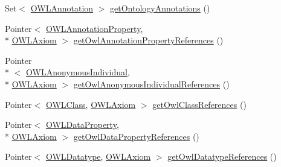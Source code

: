 \begin{DoxyCompactItemize}
\item 
Set$<$ \hyperlink{interfaceorg_1_1semanticweb_1_1owlapi_1_1model_1_1_o_w_l_annotation}{O\-W\-L\-Annotation} $>$ \hyperlink{interfaceuk_1_1ac_1_1manchester_1_1cs_1_1owl_1_1owlapi_1_1_internals_a18433a6e4962db8b311e6369831f7b9a}{get\-Ontology\-Annotations} ()
\item 
Pointer$<$ \hyperlink{interfaceorg_1_1semanticweb_1_1owlapi_1_1model_1_1_o_w_l_annotation_property}{O\-W\-L\-Annotation\-Property}, \\*
\hyperlink{interfaceorg_1_1semanticweb_1_1owlapi_1_1model_1_1_o_w_l_axiom}{O\-W\-L\-Axiom} $>$ \hyperlink{interfaceuk_1_1ac_1_1manchester_1_1cs_1_1owl_1_1owlapi_1_1_internals_a09768fe68798949a916e32e77f49a562}{get\-Owl\-Annotation\-Property\-References} ()
\item 
Pointer\\*
$<$ \hyperlink{interfaceorg_1_1semanticweb_1_1owlapi_1_1model_1_1_o_w_l_anonymous_individual}{O\-W\-L\-Anonymous\-Individual}, \\*
\hyperlink{interfaceorg_1_1semanticweb_1_1owlapi_1_1model_1_1_o_w_l_axiom}{O\-W\-L\-Axiom} $>$ \hyperlink{interfaceuk_1_1ac_1_1manchester_1_1cs_1_1owl_1_1owlapi_1_1_internals_af9fe892b1fda5d8f3a686e1f666b7e92}{get\-Owl\-Anonymous\-Individual\-References} ()
\item 
Pointer$<$ \hyperlink{interfaceorg_1_1semanticweb_1_1owlapi_1_1model_1_1_o_w_l_class}{O\-W\-L\-Class}, \hyperlink{interfaceorg_1_1semanticweb_1_1owlapi_1_1model_1_1_o_w_l_axiom}{O\-W\-L\-Axiom} $>$ \hyperlink{interfaceuk_1_1ac_1_1manchester_1_1cs_1_1owl_1_1owlapi_1_1_internals_a7789715e2bdbde471d9caa99d000919d}{get\-Owl\-Class\-References} ()
\item 
Pointer$<$ \hyperlink{interfaceorg_1_1semanticweb_1_1owlapi_1_1model_1_1_o_w_l_data_property}{O\-W\-L\-Data\-Property}, \\*
\hyperlink{interfaceorg_1_1semanticweb_1_1owlapi_1_1model_1_1_o_w_l_axiom}{O\-W\-L\-Axiom} $>$ \hyperlink{interfaceuk_1_1ac_1_1manchester_1_1cs_1_1owl_1_1owlapi_1_1_internals_a6c01fdaf337c176cceda1cb851511fa5}{get\-Owl\-Data\-Property\-References} ()
\item 
Pointer$<$ \hyperlink{interfaceorg_1_1semanticweb_1_1owlapi_1_1model_1_1_o_w_l_datatype}{O\-W\-L\-Datatype}, \hyperlink{interfaceorg_1_1semanticweb_1_1owlapi_1_1model_1_1_o_w_l_axiom}{O\-W\-L\-Axiom} $>$ \hyperlink{interfaceuk_1_1ac_1_1manchester_1_1cs_1_1owl_1_1owlapi_1_1_internals_ada3f5233d8d0b46a97d673a63390fc23}{get\-Owl\-Datatype\-References} ()
\item 

\end{DoxyCompactItemize}
